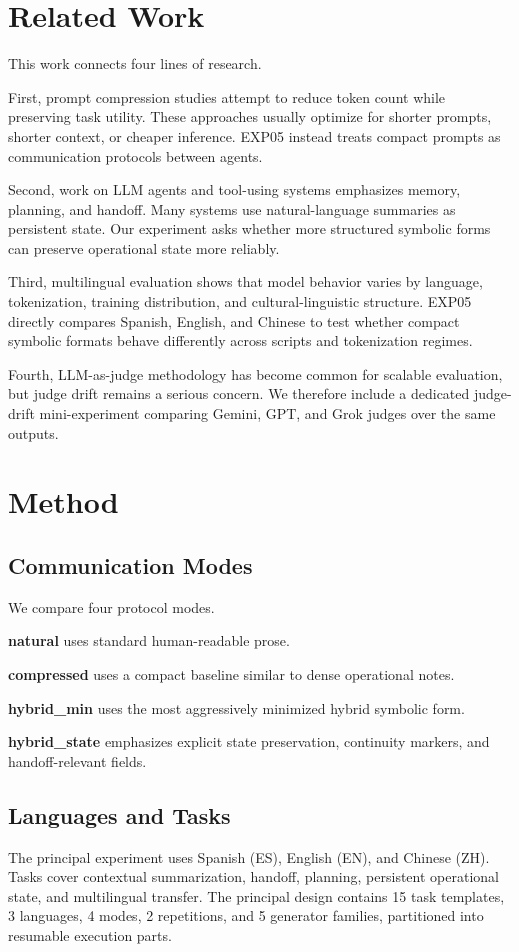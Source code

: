 \documentclass[11pt]{article}
\begin{document}
\section{Related Work}
This work connects four lines of research.

First, prompt compression studies attempt to reduce token count while preserving task utility. These approaches usually optimize for shorter prompts, shorter context, or cheaper inference. EXP05 instead treats compact prompts as communication protocols between agents.

Second, work on LLM agents and tool-using systems emphasizes memory, planning, and handoff. Many systems use natural-language summaries as persistent state. Our experiment asks whether more structured symbolic forms can preserve operational state more reliably.

Third, multilingual evaluation shows that model behavior varies by language, tokenization, training distribution, and cultural-linguistic structure. EXP05 directly compares Spanish, English, and Chinese to test whether compact symbolic formats behave differently across scripts and tokenization regimes.

Fourth, LLM-as-judge methodology has become common for scalable evaluation, but judge drift remains a serious concern. We therefore include a dedicated judge-drift mini-experiment comparing Gemini, GPT, and Grok judges over the same outputs.

\section{Method}
\subsection{Communication Modes}
We compare four protocol modes.

\textbf{natural} uses standard human-readable prose.

\textbf{compressed} uses a compact baseline similar to dense operational notes.

\textbf{hybrid\_min} uses the most aggressively minimized hybrid symbolic form.

\textbf{hybrid\_state} emphasizes explicit state preservation, continuity markers, and handoff-relevant fields.

\subsection{Languages and Tasks}
The principal experiment uses Spanish (ES), English (EN), and Chinese (ZH). Tasks cover contextual summarization, handoff, planning, persistent operational state, and multilingual transfer. The principal design contains 15 task templates, 3 languages, 4 modes, 2 repetitions, and 5 generator families, partitioned into resumable execution parts.
\end{document}
